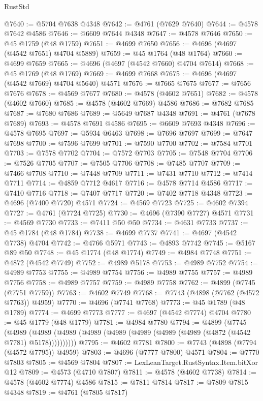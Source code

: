 \begin{lexlean}{RustStd}
\begin{coremodule}
@7640 := @5704 @7638 @4348
@7642 := @4761 (@7629 @7640)
@7644 := @4578 @7642 @4586
@7646 := @6609 @7644 @4348
@7647 := @4578 @7646
@7650 := @45 @1759 (@48 @1759)
@7651 := @4699 @7650
@7656 := @4696 (@4697 (@4542 @7651) @4704 @5889)
@7659 := @45 @1764 (@48 @1764)
@7660 := @4699 @7659
@7665 := @4696 (@4697 (@4542 @7660) @4704 @7614)
@7668 := @45 @1769 (@48 @1769)
@7669 := @4699 @7668
@7675 := @4696 (@4697 (@4542 @7669) @4704 @5640) @4571
@7676 := @7665 @7675
@7677 := @7656 @7676
@7678 := @4569 @7677
@7680 := @4578 (@4602 @7651)
@7682 := @4578 (@4602 @7660)
@7685 := @4578 (@4602 @7669) @4586
@7686 := @7682 @7685
@7687 := @7680 @7686
@7689 := @5649 @7687 @4348
@7691 := @4761 (@7678 @7689)
@7693 := @4578 @7691 @4586
@7695 := @6609 @7693 @4348
@7696 := @4578 @7695
@7697 := @5934 @6463
@7698 := @7696 @7697
@7699 := @7647 @7698
@7700 := @7596 @7699
@7701 := @7590 @7700
@7702 := @7584 @7701
@7703 := @7578 @7702
@7704 := @7572 @7703
@7705 := @7548 @7704
@7706 := @7526 @7705
@7707 := @7505 @7706
@7708 := @7485 @7707
@7709 := @7466 @7708
@7710 := @7448 @7709
@7711 := @7431 @7710
@7712 := @7414 @7711
@7714 := @4859 @7712 @4617
@7716 := @4578 @7714 @4586
@7717 := @7410 @7716
@7718 := @7407 @7717
@7720 := @7402 @7718 @4348
@7723 := @4696 (@7400 @7720) @4571
@7724 := @4569 @7723
@7725 := @4602 @7394
@7727 := @4761 (@7724 @7725)
@7730 := @4696 (@7390 @7727) @4571
@7731 := @4569 @7730
@7733 := @7411 @50 @50
@7734 := @4631 @7733
@7737 := @45 @1784 (@48 @1784)
@7738 := @4699 @7737
@7741 := @4697 (@4542 @7738) @4704
@7742 := @4766 @5971
@7743 := @4893 @7742
@7745 := @5167 @89 @50
@7748 := @45 @1774 (@48 @1774)
@7749 := @4984 @7748
@7751 := @4872 (@4542 @7749)
@7752 := @4989 @5178
@7753 := @4989 @7752
@7754 := @4989 @7753
@7755 := @4989 @7754
@7756 := @4989 @7755
@7757 := @4989 @7756
@7758 := @4989 @7757
@7759 := @4989 @7758
@7762 := @4899 (@7745 (@7751 @7759))
@7763 := @4602 @7749
@7768 := @7743 (@4898 (@7762 (@4572 @7763)) @4959)
@7770 := @4696 (@7741 @7768)
@7773 := @45 @1789 (@48 @1789)
@7774 := @4699 @7773
@7777 := @4697 (@4542 @7774) @4704
@7780 := @45 @1779 (@48 @1779)
@7781 := @4984 @7780
@7794 := @4899
    (@7745
      (@4989 (@4989 (@4989 (@4989 (@4989 (@4989 (@4989 (@4989 (@4872 (@4542 @7781) @5178))))))))))
@7795 := @4602 @7781
@7800 := @7743 (@4898 (@7794 (@4572 @7795)) @4959)
@7803 := @4696 (@7777 @7800) @4571
@7804 := @7770 @7803
@7805 := @4569 @7804
@7807 := LexLeanTarget.RustSyntax.Item.bitXor @12
@7809 := @4573 (@4710 @7807)
@7811 := @4578 (@4602 @7738)
@7814 := @4578 (@4602 @7774) @4586
@7815 := @7811 @7814
@7817 := @7809 @7815 @4348
@7819 := @4761 (@7805 @7817)

\end{coremodule}
\end{lexlean}
